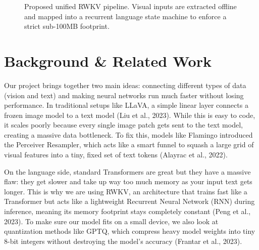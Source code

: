 \documentclass[final]{article}
\begin{document}
\begin{figure}[!h]
  \centering
  \caption{Proposed unified RWKV pipeline. Visual inputs are extracted offline and mapped into
  a recurrent language state machine to enforce a strict sub-100MB footprint.}
  \label{fig:pipeline}
\end{figure}

\section*{Background \& Related Work}

Our project brings together two main ideas: connecting different types of data (vision and
text) and making neural networks run much faster without losing performance. In traditional
setups like LLaVA, a simple linear layer connects a frozen image model to a text model (Liu et
al., 2023). While this is easy to code, it scales poorly because every single image patch gets
sent to the text model, creating a massive data bottleneck. To fix this, models like Flamingo
introduced the Perceiver Resampler, which acts like a smart funnel to squash a large grid of
visual features into a tiny, fixed set of text tokens (Alayrac et al., 2022).

On the language side, standard Transformers are great but they have a massive flaw: they get
slower and take up way too much memory as your input text gets longer. This is why we are using
RWKV, an architecture that trains fast like a Transformer but acts like a lightweight Recurrent
Neural Network (RNN) during inference, meaning its memory footprint stays completely constant
(Peng et al., 2023). To make sure our model fits on a small device, we also look at
quantization methods like GPTQ, which compress heavy model weights into tiny 8-bit integers
without destroying the model's accuracy (Frantar et al., 2023).
\end{document}
